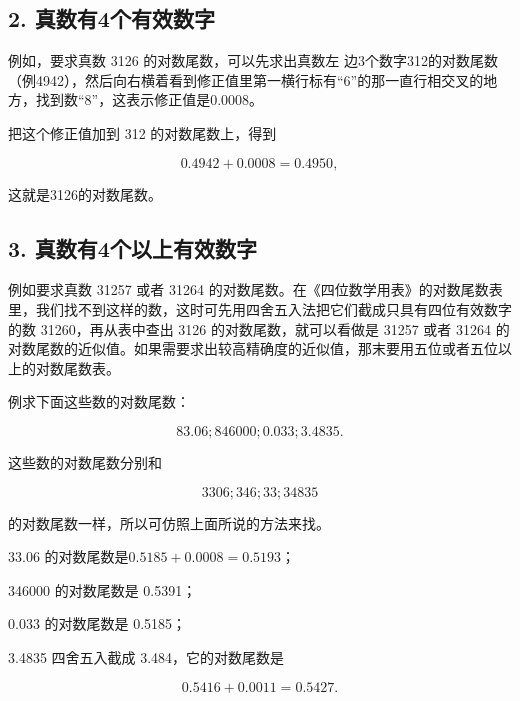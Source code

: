 \subsection{2. 真数有4个有效数字}

例如，要求真数 3126 的对数尾数，可以先求出真数左
边3个数字312的对数尾数（例4942），然后向右横着看到修正值里第一横行标有``6''的那一直行相交叉的地方，找到数``8''，这表示修正值是0.0008。

{\centering
\small\setlength{\tabcolsep}{3pt}%
\par
}

把这个修正值加到 312 的对数尾数上，得到

\[
0.4942 + 0.0008 = 0.4950,
\]

这就是3126的对数尾数。

\subsection{3. 真数有4个以上有效数字}

例如要求真数 31257 或者 31264
的对数尾数。在《四位数学用表》的对数尾数表里，我们找不到这样的数，这时可先用四舍五入法把它们截成只具有四位有效数字的数
31260，再从表中查出 3126 的对数尾数，就可以看做是 31257 或者 31264
的对数尾数的近似值。如果需要求出较高精确度的近似值，那末要用五位或者五位以上的对数尾数表。

例求下面这些数的对数尾数：

\[
83.06; 846000; 0.033; 3.4835.
\]

 这些数的对数尾数分别和

\[
3306; 346; 33; 34835
\]

的对数尾数一样，所以可仿照上面所说的方法来找。

 33.06 的对数尾数是\(0.5185 + 0.0008 = 0.5193\)；

346000 的对数尾数是 0.5391；

0.033 的对数尾数是 0.5185；

3.4835 四舍五入截成 3.484，它的对数尾数是

\[
0.5416 + 0.0011 = 0.5427.
\]

